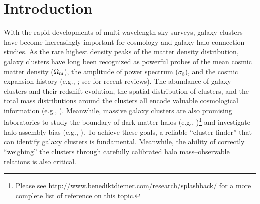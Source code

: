 \documentclass[fleqn,usenatbib,useAMS,english]{mnras}
\begin{document}


\section{Introduction}
    \label{sec:intro}
    
    With the rapid developments of multi-wavelength sky surveys, galaxy clusters
    have become increasingly important for cosmology and galaxy-halo connection studies.
    As the rare highest density peaks of the matter density distribution, galaxy clusters 
    have long been recognized as powerful probes of the mean cosmic matter density 
    ($\Omega_{\rm m}$), the amplitude of power spectrum ($\sigma_{8}$), and the cosmic expansion
    history (e.g.,
    \citealt{Evrard1989, Peebles1989, White1993, Viana1996, Wang1998}; 
    see \citealt{Allen2011, Kravtsov2012, Weinberg2013} for recent reviews).
    The abundance of galaxy clusters and their redshift evolution, the spatial distribution of 
    clusters, and the total mass distributions around the clusters all encode valuable 
    cosmological information (e.g., \citealt{Haiman2001, Holder2001, Vikhlinin2009b, Rozo2010, 
    Benson2013, Mantz2014, Bocquet2019, Abbott2020, To2021a, To2021b, Wu2021}).
    Meanwhile, massive galaxy clusters are also promising laboratories to study the boundary of
    dark matter halos (e.g., \citealt{Diemer2014, More2015b,
    More2016, Chang2018, Shin2019, Zurcher2019, Tomooka2020})\footnote{Please see
    \url{http://www.benediktdiemer.com/research/splashback/} for a more complete list of
    reference on this topic.} and investigate halo assembly bias (e.g., \citealt{Miyatake2016,
    Zu2017}).
    To achieve these goals, a reliable ``cluster finder'' that can identify galaxy clusters 
    is fundamental.
    Meanwhile, the ability of correctly ``weighing'' the clusters through 
    carefully calibrated halo mass--observable relations is also critical.
    
\end{document}
